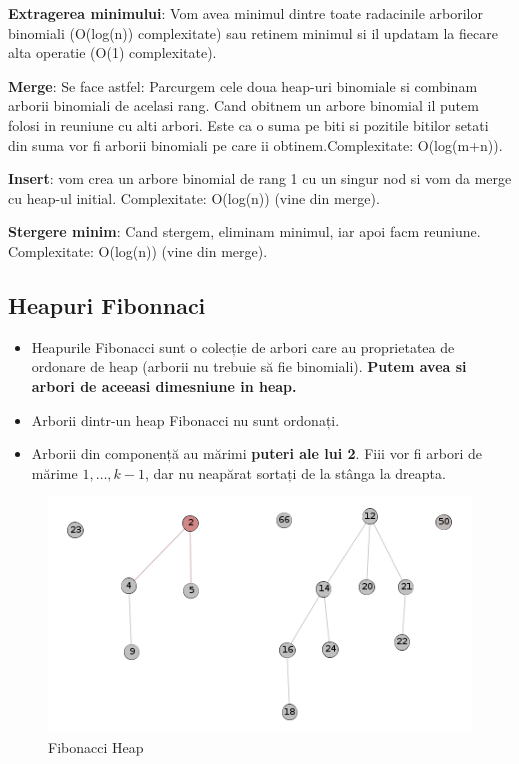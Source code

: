 \documentclass[11pt,a4paper]{article}
\theoremstyle{definition}
\theoremstyle{plain}
\theoremstyle{remark}
\begin{document}
\textbf{Extragerea minimului}: Vom avea minimul dintre toate radacinile arborilor binomiali (O(log(n)) complexitate) sau retinem minimul si il updatam la fiecare alta operatie (O(1) complexitate).

\textbf{Merge}: Se face astfel: Parcurgem cele doua heap-uri binomiale si combinam arborii binomiali de acelasi rang. Cand obitnem un arbore binomial il putem folosi in reuniune cu alti arbori. Este ca o suma pe biti si pozitile bitilor setati din suma vor fi arborii binomiali pe care ii obtinem.Complexitate: O(log(m+n)).

\textbf{Insert}: vom crea un arbore binomial de rang 1 cu un singur nod si vom da merge cu heap-ul initial. Complexitate: O(log(n)) (vine din merge).

\textbf{Stergere minim}: Cand stergem, eliminam minimul, iar apoi facm reuniune. Complexitate: O(log(n)) (vine din merge).

\subsection{Heapuri Fibonnaci}

\begin{itemize}
    \item Heapurile Fibonacci sunt o colecție de arbori care au proprietatea de ordonare de heap (arborii nu trebuie să fie binomiali). \textbf{Putem avea si arbori de aceeasi dimesniune in heap.}
    \item Arborii dintr-un heap Fibonacci nu sunt ordonați.
    \item Arborii din componență au mărimi \textbf{puteri ale lui 2}. Fiii vor fi arbori de mărime $1,…, k-1$, dar nu neapărat sortați de la stânga la dreapta.
\end{itemize}

\begin{figure}[H]
    \centering
    \includegraphics[width=0.75\linewidth]{fibonacci-heap.png}
    \caption{Fibonacci Heap}
    \label{fig:enter-label}
\end{figure}
\end{document}
